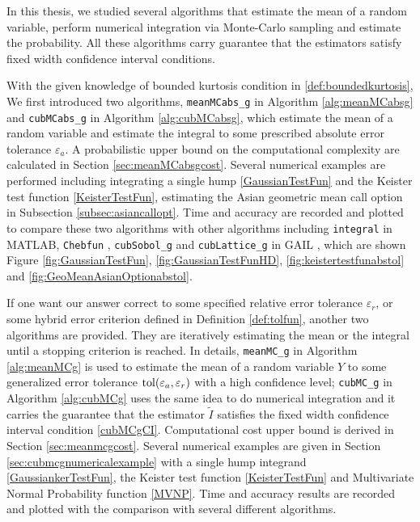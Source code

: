 \documentclass{iitthesis}
\begin{document}
 
 
\label{chapter:comclusion}
In this thesis, we studied several algorithms that estimate the mean of a random variable, perform numerical integration via Monte-Carlo sampling and estimate the probability. All these algorithms carry guarantee that the estimators satisfy fixed width confidence interval conditions.

With the given knowledge of bounded kurtosis condition in \eqref{def:boundedkurtosis}, We first introduced two algorithms, {\tt meanMCabs\_g} in Algorithm \ref{alg:meanMCabsg} and {\tt cubMCabs\_g} in Algorithm \ref{alg:cubMCabsg}, which estimate the mean of a random variable and estimate the integral to some prescribed absolute error tolerance $\varepsilon_a$. A probabilistic upper bound on the computational complexity are calculated in Section \ref{sec:meanMCabsgcost}. Several numerical examples are performed including integrating a single hump \eqref{GaussianTestFun} and the Keister test function \eqref{KeisterTestFun}, estimating the Asian geometric mean call option in Subsection \ref{subsec:asiancallopt}. Time and accuracy are recorded and plotted to compare these two algorithms with other algorithms including {\tt integral} in MATLAB, {\tt Chebfun} \cite{Chebfun14}, {\tt cubSobol\_g} and {\tt cubLattice\_g} in GAIL \cite{GAIL_1_3}, which are shown Figure \ref{fig:GaussianTestFun}, \ref{fig:GaussianTestFunHD}, \ref{fig:keistertestfunabstol} and \ref{fig:GeoMeanAsianOptionabstol}.

If one want our answer correct to some specified relative error tolerance $\varepsilon_r$, or some hybrid error criterion defined in Definition \ref{def:tolfun}, another two algorithms are provided. They are iteratively estimating the mean or the integral until a stopping criterion is reached. In details, {\tt meanMC\_g} in Algorithm \ref{alg:meanMCg} is used to estimate the mean of a random variable $Y$ to some generalized error tolerance $\operatorname{tol}(\varepsilon_a, \varepsilon_r)$ with a high confidence level; {\tt cubMC\_g} in Algorithm \ref{alg:cubMCg} uses the same idea to do numerical integration and it carries the guarantee that the estimator $\tilde{I}$ satisfies the fixed width confidence interval condition \eqref{cubMCgCI}. Computational cost upper bound is derived in Section \ref{sec:meanmcgcost}. Several numerical examples are given in Section \ref{sec:cubmcgnumericalexample} with a single hump integrand \eqref{GaussiankerTestFun}, the Keister test function \eqref{KeisterTestFun} and Multivariate Normal Probability function \eqref{MVNP}. Time and accuracy results are recorded and plotted with the comparison with several different algorithms.
\end{document}
